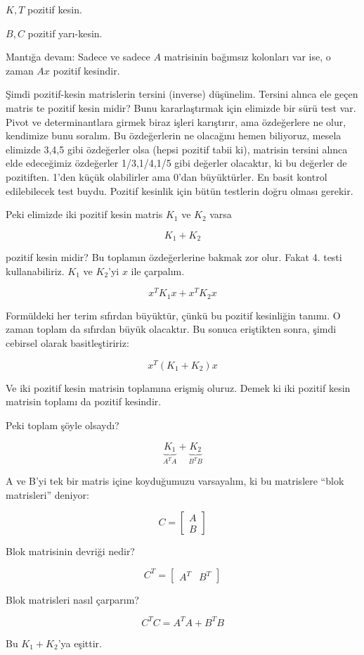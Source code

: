 \documentclass[12pt,fleqn]{article}\usepackage{../../common}
\begin{document}
$K,T$ pozitif kesin. 

$B, C$ pozitif yarı-kesin. 

Mantığa devam: Sadece ve sadece $A$ matrisinin bağımsız kolonları var ise,
o zaman $Ax$ pozitif kesindir. 

Şimdi pozitif-kesin matrislerin tersini (inverse) düşünelim. Tersini alınca
ele geçen matris te pozitif kesin midir? Bunu kararlaştırmak için elimizde
bir sürü test var. Pivot ve determinantlara girmek biraz işleri karıştırır,
ama özdeğerlere ne olur, kendimize bunu soralım. Bu özdeğerlerin ne
olacağını hemen biliyoruz, mesela elimizde 3,4,5 gibi özdeğerler olsa
(hepsi pozitif tabii ki), matrisin tersini alınca elde edeceğimiz
özdeğerler 1/3,1/4,1/5 gibi değerler olacaktır, ki bu değerler de
pozitiften. 1'den küçük olabilirler ama 0'dan büyüktürler. En basit kontrol
edilebilecek test buydu. Pozitif kesinlik için bütün testlerin doğru olması
gerekir. 

Peki elimizde iki pozitif kesin matris $K_1$ ve $K_2$ varsa 

$$ K_1 + K_2 $$

pozitif kesin midir? Bu toplamın özdeğerlerine bakmak zor olur. Fakat
4. testi kullanabiliriz. $K_1$ ve $K_2$'yi $x$ ile çarpalım. 

$$ x^TK_1x + x^TK_2x $$

Formüldeki her terim sıfırdan büyüktür, çünkü bu pozitif kesinliğin
tanımı. O zaman toplam da sıfırdan büyük olacaktır. Bu sonuca eriştikten
sonra, şimdi cebirsel olarak basitleştiririz:

$$ x^T(K_1 + K_2)x $$

Ve iki pozitif kesin matrisin toplamına erişmiş oluruz. Demek ki iki
pozitif kesin matrisin toplamı da pozitif kesindir. 

Peki toplam şöyle olsaydı?

$$ \underbrace{K_1}_{A^TA} + \underbrace{K_2}_{B^TB} $$

A ve B'yi tek bir matris içine koyduğumuzu varsayalım, ki bu matrislere
``blok matrisleri'' deniyor:

$$ C = 
\left[\begin{array}{r}
A \\
B
\end{array}\right]
 $$

Blok matrisinin devriği nedir? 

$$ 
C^T = 
\left[\begin{array}{rr}
A^T & B^T
\end{array}\right]
 $$

Blok matrisleri nasıl çarparım?

$$  
C^TC = A^TA + B^TB 
$$  

Bu $K_1 + K_2$'ya eşittir. 
\end{document}
